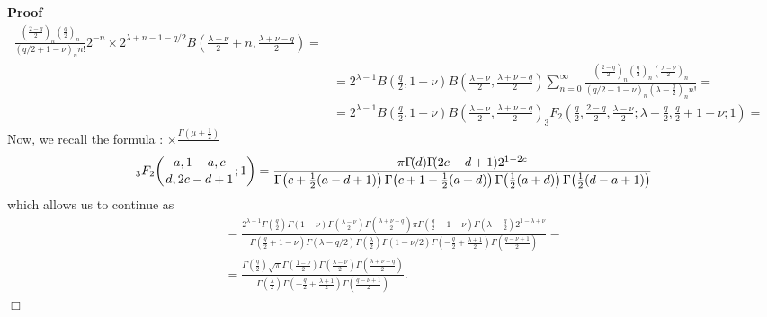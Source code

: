 \documentclass{article}
\newcommand{\ontop}[2]{\genfrac{}{}{0pt}{}{#1}{#2}}
\renewenvironment{proof}{\noindent\textbf{Proof\ }}{\hspace*{\fill}$\Box$\medskip}
\theoremstyle{remark}
\begin{document}
\begin{proof}
\begin{eqnarray}
    \frac{\left( \frac{2 - q}{2} \right)_n \left( \frac{q}{2} \right)_n}{(q /
    2 + 1 - \nu)_n n!} 2^{- n} \times 2^{\lambda + n - 1 - q / 2} B \left(
    \frac{\lambda - \nu}{2} + n, \frac{\lambda + \nu - q}{2} \right) = & 
    \nonumber\\
    & = 2^{\lambda - 1} B \left( \frac{q}{2}, 1 - \nu \right) B \left(
    \frac{\lambda - \nu}{2}, \frac{\lambda + \nu - q}{2} \right) \sum_{n =
    0}^{\infty} \frac{\left( \frac{2 - q}{2} \right)_n \left( \frac{q}{2}
    \right)_n \left( \frac{\lambda - \nu}{2} \right)_n}{(q / 2 + 1 - \nu)_n
    \left( \lambda - \frac{q}{2} \right)_n n!} = &  \nonumber\\
    & = 2^{\lambda - 1} B \left( \frac{q}{2}, 1 - \nu \right) B \left(
    \frac{\lambda - \nu}{2}, \frac{\lambda + \nu - q}{2} \right) _3 F_2
    \left( \frac{q}{2}, \frac{2 - q}{2}, \frac{\lambda - \nu}{2} ; \lambda -
    \frac{q}{2}, \frac{q}{2} + 1 - \nu ; 1 \right) = &  \nonumber
  \end{eqnarray}
  Now, we recall the formula
  {\cite[\href{}{\href{http://dlmf.nist.gov/16.4.E7}{http://dlmf.nist.gov/16.4.E7}}]{NIST:DLMF}}:
  $\times \frac{\Gamma \left( \mu + \frac{1}{2} \right)}{}$
  \[ _3 F_2 \hspace{-0.17em} \left( \ontop{a, 1 - a, c}{d, 2 c - d + 1} ; 1
     \right) = \frac{\pi \Gamma \hspace{-0.17em} (d) \Gamma \hspace{-0.17em}
     (2 c - d + 1) 2^{1 - 2 c}}{\Gamma \hspace{-0.17em} \left( c + \frac{1}{2}
     (a - d + 1) \right) \Gamma \hspace{-0.17em} \left( c + 1 - \frac{1}{2} (a
     + d) \right) \Gamma \hspace{-0.17em} \left( \frac{1}{2} (a + d) \right)
     \Gamma \hspace{-0.17em} \left( \frac{1}{2} (d - a + 1) \right)} \]
  which allows us to continue as
  \begin{eqnarray}
    & = \frac{2^{\lambda - 1} \Gamma \left( \frac{q}{2} \right) \Gamma (1 -
    \nu) \Gamma \left( \frac{\lambda - \nu}{2} \right) \Gamma \left(
    \frac{\lambda + \nu - q}{2} \right) \pi \Gamma \left( \frac{q}{2} + 1 -
    \nu \right) \Gamma \left( \lambda - \frac{q}{2} \right) 2^{1 - \lambda +
    \nu}}{\Gamma \left( \frac{q}{2} + 1 - \nu \right) \Gamma (\lambda - q / 2)
    \Gamma \left( \frac{\lambda}{2} \right) \Gamma (1 - \nu / 2) \Gamma \left(
    - \frac{q}{2} + \frac{\lambda + 1}{2} \right) \Gamma \left( \frac{q - \nu
    + 1}{2} \right)} = &  \nonumber\\
    & = \frac{\Gamma \left( \frac{q}{2} \right) \sqrt{\pi} \Gamma \left(
    \frac{1 - \nu}{2} \right) \Gamma \left( \frac{\lambda - \nu}{2} \right)
    \Gamma \left( \frac{\lambda + \nu - q}{2} \right)}{\Gamma \left(
    \frac{\lambda}{2} \right) \Gamma \left( - \frac{q}{2} + \frac{\lambda +
    1}{2} \right) \Gamma \left( \frac{q - \nu + 1}{2} \right)} . &  \nonumber
  \end{eqnarray}
\end{proof}
\end{document}
